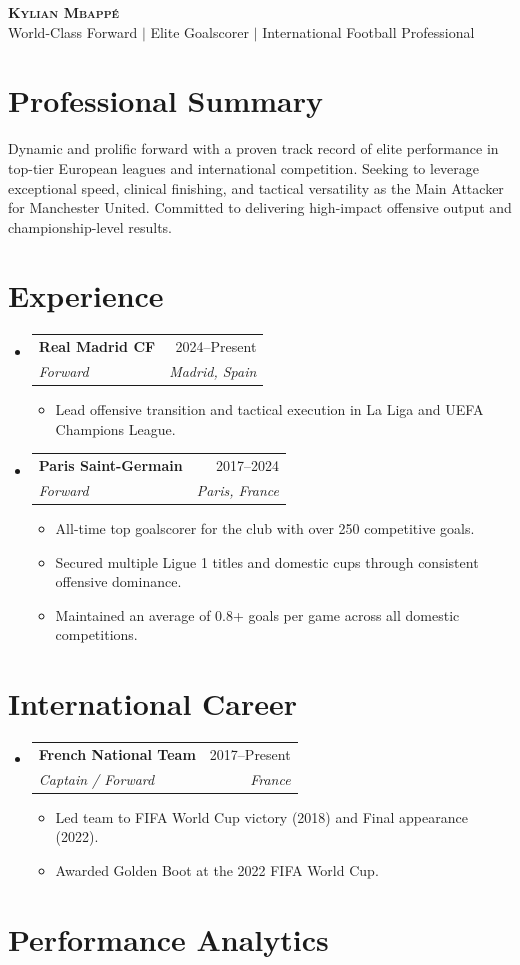 \documentclass[letterpaper,11pt]{article}
\makeatletter
\newcommand{\resumeItem}[1]{\item\small{{#1 \vspace{-2pt}}}}
\newcommand{\resumeSubheading}[4]{
\vspace{-2pt}\item
\begin{tabular*}{0.97\textwidth}[t]{l@{\extracolsep{\fill}}r}
\textbf{#1} & #2 \\
\textit{\small#3} & \textit{\small #4} \\
\end{tabular*}\vspace{-7pt}}
\newcommand{\resumeSubHeadingListStart}{\begin{itemize}[leftmargin=0.15in, label={}]}
\newcommand{\resumeSubHeadingListEnd}{\end{itemize}}
\newcommand{\resumeItemListStart}{\begin{itemize}}
\newcommand{\resumeItemListEnd}{\end{itemize}\vspace{-5pt}}
\makeatother
\begin{document}
\begin{center}
\textbf{\Huge \scshape Kylian Mbappé} \\ \vspace{1pt}
\small World-Class Forward $|$ Elite Goalscorer $|$ International Football Professional
\end{center}

\section{Professional Summary}
Dynamic and prolific forward with a proven track record of elite performance in top-tier European leagues and international competition. Seeking to leverage exceptional speed, clinical finishing, and tactical versatility as the Main Attacker for Manchester United. Committed to delivering high-impact offensive output and championship-level results.

\section{Experience}
\resumeSubHeadingListStart
\resumeSubheading{Real Madrid CF}{2024--Present}{Forward}{Madrid, Spain}
\resumeItemListStart
\resumeItem{Lead offensive transition and tactical execution in La Liga and UEFA Champions League.}
\resumeItemListEnd

\resumeSubheading{Paris Saint-Germain}{2017--2024}{Forward}{Paris, France}
\resumeItemListStart
\resumeItem{All-time top goalscorer for the club with over 250 competitive goals.}
\resumeItem{Secured multiple Ligue 1 titles and domestic cups through consistent offensive dominance.}
\resumeItem{Maintained an average of 0.8+ goals per game across all domestic competitions.}
\resumeItemListEnd
\resumeSubHeadingListEnd

\section{International Career}
\resumeSubHeadingListStart
\resumeSubheading{French National Team}{2017--Present}{Captain / Forward}{France}
\resumeItemListStart
\resumeItem{Led team to FIFA World Cup victory (2018) and Final appearance (2022).}
\resumeItem{Awarded Golden Boot at the 2022 FIFA World Cup.}
\resumeItemListEnd
\resumeSubHeadingListEnd

\section{Performance Analytics}
\begin{center}
\end{center}
\end{document}

